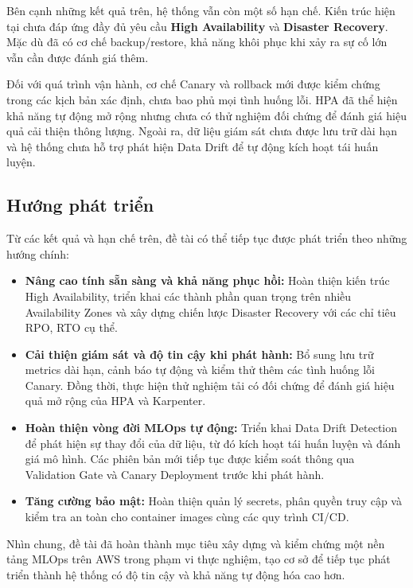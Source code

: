 Bên cạnh những kết quả trên, hệ thống vẫn còn một số hạn chế. Kiến trúc hiện tại chưa đáp ứng đầy đủ yêu cầu \textbf{High Availability} và \textbf{Disaster Recovery}. Mặc dù đã có cơ chế backup/restore, khả năng khôi phục khi xảy ra sự cố lớn vẫn cần được đánh giá thêm.


Đối với quá trình vận hành, cơ chế Canary và rollback mới được kiểm chứng trong các kịch bản xác định, chưa bao phủ mọi tình huống lỗi. HPA đã thể hiện khả năng tự động mở rộng nhưng chưa có thử nghiệm đối chứng để đánh giá hiệu quả cải thiện thông lượng. Ngoài ra, dữ liệu giám sát chưa được lưu trữ dài hạn và hệ thống chưa hỗ trợ phát hiện Data Drift để tự động kích hoạt tái huấn luyện.


\subsection{Hướng phát triển}


Từ các kết quả và hạn chế trên, đề tài có thể tiếp tục được phát triển theo những hướng chính:


\begin{itemize}

\item 

\textbf{Nâng cao tính sẵn sàng và khả năng phục hồi:} Hoàn thiện kiến trúc High Availability, triển khai các thành phần quan trọng trên nhiều Availability Zones và xây dựng chiến lược Disaster Recovery với các chỉ tiêu RPO, RTO cụ thể.


\item 

\textbf{Cải thiện giám sát và độ tin cậy khi phát hành:} Bổ sung lưu trữ metrics dài hạn, cảnh báo tự động và kiểm thử thêm các tình huống lỗi Canary. Đồng thời, thực hiện thử nghiệm tải có đối chứng để đánh giá hiệu quả mở rộng của HPA và Karpenter.


\item 

\textbf{Hoàn thiện vòng đời MLOps tự động:} Triển khai Data Drift Detection để phát hiện sự thay đổi của dữ liệu, từ đó kích hoạt tái huấn luyện và đánh giá mô hình. Các phiên bản mới tiếp tục được kiểm soát thông qua Validation Gate và Canary Deployment trước khi phát hành.


\item 

\textbf{Tăng cường bảo mật:} Hoàn thiện quản lý secrets, phân quyền truy cập và kiểm tra an toàn cho container images cùng các quy trình CI/CD.


\end{itemize}

Nhìn chung, đề tài đã hoàn thành mục tiêu xây dựng và kiểm chứng một nền tảng MLOps trên AWS trong phạm vi thực nghiệm, tạo cơ sở để tiếp tục phát triển thành hệ thống có độ tin cậy và khả năng tự động hóa cao hơn.

